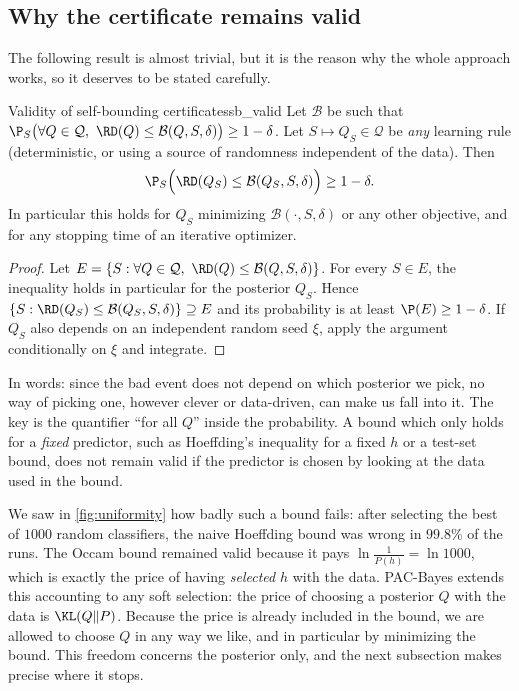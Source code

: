 \subsection{Why the certificate remains valid}

The following result is almost trivial, but it is the reason why the whole
approach works, so it deserves to be stated carefully.

\begin{theorem}{Validity of self-bounding certificates}{sb_valid}
Let $\mathcal B$ be such that $\P_S\big(\forall Q\in\mathcal Q,\ \RD(Q)\leq\mathcal B(Q,S,\delta)\big)\geq1-\delta$.
Let $S\mapsto Q_S\in\mathcal Q$ be \emph{any} learning rule (deterministic, or using a
source of randomness independent of the data). Then
\[
\P_S\Big(\RD(Q_S)\leq\mathcal B(Q_S,S,\delta)\Big)\geq1-\delta .
\]
In particular this holds for $Q_S$ minimizing $\mathcal B(\cdot,S,\delta)$ or any
other objective, and for any stopping time of an iterative optimizer.
\end{theorem}
\begin{proof}
Let $E=\{S:\forall Q\in\mathcal Q,\ \RD(Q)\leq\mathcal B(Q,S,\delta)\}$. For every
$S\in E$, the inequality holds in particular for the posterior $Q_S$. Hence
$\{S:\RD(Q_S)\leq\mathcal B(Q_S,S,\delta)\}\supseteq E$ and its probability is at
least $\P(E)\geq1-\delta$. If $Q_S$ also depends on an independent random seed $\xi$,
apply the argument conditionally on $\xi$ and integrate.
\end{proof}

In words: since the bad event does not depend on which posterior we pick, no
way of picking one, however clever or data-driven, can make us fall into it.
The key is the quantifier ``for all $Q$'' inside the probability. A bound which
only holds for a \emph{fixed} predictor, such as Hoeffding's inequality for a
fixed $h$ or a test-set bound, does not remain valid if the predictor is chosen
by looking at the data used in the bound.

We saw in \cref{fig:uniformity} how
badly such a bound fails: after selecting the best of $1000$ random classifiers,
the naive Hoeffding bound was wrong in $99.8\%$ of the runs. The Occam bound
remained valid because it pays $\ln\frac{1}{P(h)}=\ln1000$, which is exactly the
price of having \emph{selected} $h$ with the data. PAC-Bayes extends this
accounting to any soft selection: the price of choosing a posterior $Q$ with the
data is $\KL(Q\|P)$. Because the price is already included in the bound, we are
allowed to choose $Q$ in any way we like, and in particular by minimizing the
bound. This freedom concerns the posterior only, and the next subsection makes
precise where it stops.

